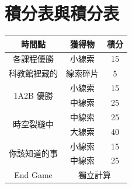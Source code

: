 \section{積分表與積分表}
\begin{table}[H]
\begin{minipage}{0.5\linewidth}
\centering
\begin{tabular}{|c|c|c|}
\hline
時間點 & 獲得物 & 積分 \\ \hline
各課程優勝 & 小線索 & 15 \\ \hline
科教館裡藏的 & 線索碎片 & 5 \\ \hline
\multirow{2}{*}{1A2B 優勝} & 小線索 & 15 \\ \cline{2-3} 
 & 中線索 & 25 \\ \hline
\multirow{2}{*}{時空裂縫中} & 中線索 & 25 \\ \cline{2-3} 
 & 大線索 & 40 \\ \hline
\multirow{2}{*}{你該知道的事} & 小線索 & 15 \\ \cline{2-3} 
 & 中線索 & 25 \\ \hline
End Game & \multicolumn{2}{c|}{獨立計算} \\ \hline
\end{tabular}
\end{minipage} \hfill
\begin{minipage}{0.45\linewidth}
\centering

\end{minipage}
\end{table}
